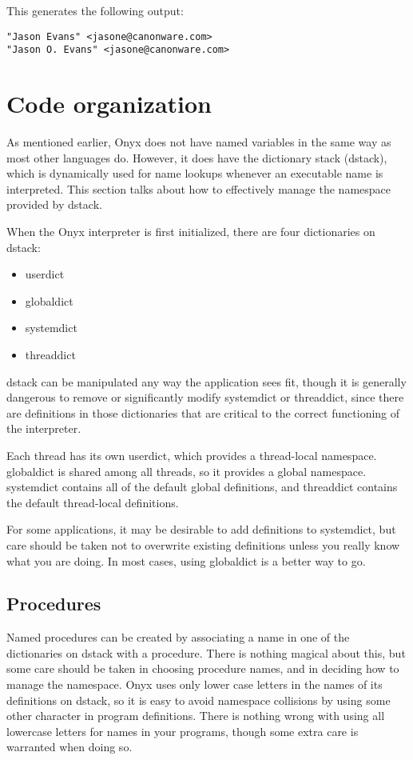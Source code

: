 This generates the following output:

\begin{verbatim}
"Jason Evans" <jasone@canonware.com>
"Jason O. Evans" <jasone@canonware.com>
\end{verbatim}

\section{Code organization}

As mentioned earlier, Onyx does not have named variables in the same way as most
other languages do.  However, it does have the dictionary stack (dstack), which
is dynamically used for name lookups whenever an executable name is interpreted.
This section talks about how to effectively manage the namespace provided by
dstack.

When the Onyx interpreter is first initialized, there are four dictionaries on
dstack:

\begin{itemize}
\item{userdict}
\item{globaldict}
\item{systemdict}
\item{threaddict}
\end{itemize}

dstack can be manipulated any way the application sees fit, though it is
generally dangerous to remove or significantly modify systemdict or threaddict,
since there are definitions in those dictionaries that are critical to the
correct functioning of the interpreter.

Each thread has its own userdict, which provides a thread-local namespace.
globaldict is shared among all threads, so it provides a global namespace.
systemdict contains all of the default global definitions, and threaddict
contains the default thread-local definitions.

For some applications, it may be desirable to add definitions to systemdict, but
care should be taken not to overwrite existing definitions unless you really
know what you are doing.  In most cases, using globaldict is a better way to
go.

\subsection{Procedures}

Named procedures can be created by associating a name in one of the dictionaries
on dstack with a procedure.  There is nothing magical about this, but some care
should be taken in choosing procedure names, and in deciding how to manage the
namespace.  Onyx uses only lower case letters in the names of its definitions on
dstack, so it is easy to avoid namespace collisions by using some other
character in program definitions.  There is nothing wrong with using all
lowercase letters for names in your programs, though some extra care is
warranted when doing so.

